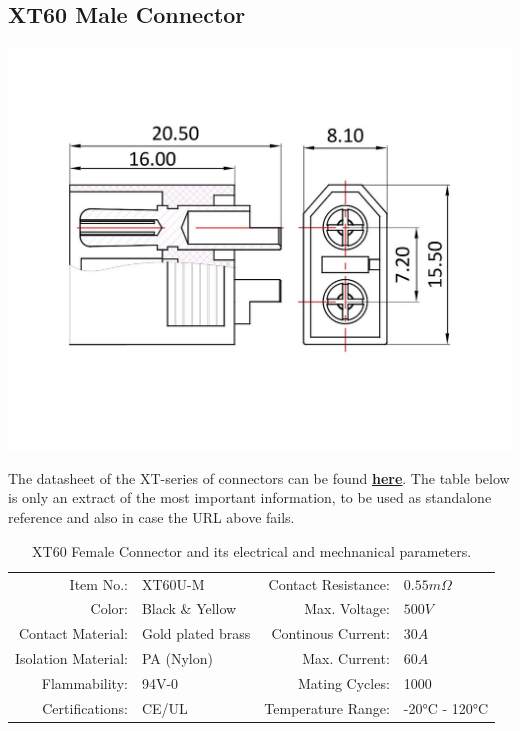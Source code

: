 \clearpage %

\subsection{XT60 Male Connector}

\includegraphics[width=\textwidth]{contents/figures/xt60_m.jpg}

The datasheet of the XT-series of connectors can be found \href{https://www.lcsc.com/datasheet/lcsc_datasheet_1810251322_Changzhou-Amass-Elec-XT60_C98733.pdf}{\textbf{\underline{here}}}.
The table below is only an extract of the most important information, to be used as standalone reference and also in case the URL above fails.

\begin{table}[h] %
    \begin{tabular}{rlrl}
         Item No.:&  XT60U-M &  Contact Resistance:& $0.55m \Omega$\\
         Color:&  Black \& Yellow&  Max. Voltage:& $500V$\\
         Contact Material:&  Gold plated brass&  Continous Current:& $30A$\\
         Isolation Material:&  PA (Nylon)&  Max. Current:& $60A$\\
         Flammability:&  94V-0&  Mating Cycles:& 1000\\
         Certifications:&  CE/UL&  Temperature Range:& -20°C - 120°C\\
    \end{tabular}
    \caption{XT60 Female Connector and its electrical and mechnanical parameters.}
    \label{tab:xt60_f_specs}
\end{table}


